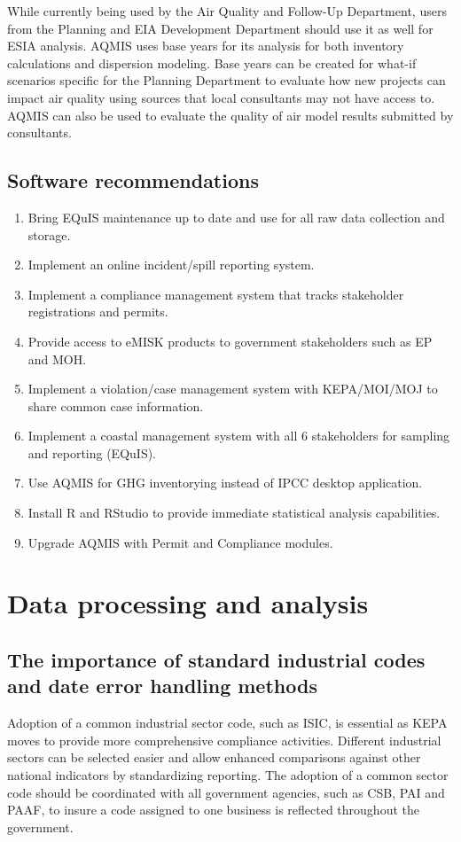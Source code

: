 While currently being used by the Air Quality and Follow-Up  Department, users from the Planning and EIA Development Department should use it as well for ESIA analysis. AQMIS uses base years for its analysis for both inventory calculations and dispersion modeling. Base years can be created for what-if scenarios specific for the Planning Department to evaluate how new projects can impact air quality using sources that local consultants may not have access to. AQMIS can also be used to evaluate the quality of air model results submitted by consultants.

\subsection{Software recommendations}
\begin{enumerate}
\item Bring EQuIS maintenance up to date and use for all raw data collection and storage.
\item Implement an online incident/spill reporting system. 
\item Implement a compliance management system that tracks stakeholder registrations and permits.
\item Provide access to eMISK products to government stakeholders such as EP and MOH.
\item Implement a violation/case management system with KEPA/MOI/MOJ to share common case information.
\item Implement a coastal management system with all 6 stakeholders for sampling and reporting (EQuIS).
\item Use AQMIS for GHG inventorying instead of IPCC desktop application.
\item Install R and RStudio to provide immediate statistical analysis capabilities.
\item Upgrade AQMIS with Permit and Compliance modules.
\end{enumerate}

\section{Data processing and analysis}

\subsection{The importance of  standard industrial codes and date error handling methods}
Adoption of a common industrial sector code, such as ISIC, is essential as KEPA moves to provide more comprehensive  compliance activities. Different industrial sectors can be selected easier and allow enhanced comparisons against other national indicators by standardizing reporting. The adoption of a common sector code should be coordinated with all government agencies, such as CSB, PAI and PAAF, to insure a code assigned to one business is reflected throughout the government.

